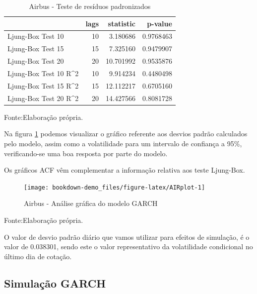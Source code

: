 \documentclass[
  12pt,
  a4paper,
  openany]{book}
\theoremstyle{definition}
\theoremstyle{definition}
\theoremstyle{definition}
\theoremstyle{remark}
\begin{document}
\begin{table}[!h]

\caption{\label{tab:AIRLjunk}Airbus - Teste de resíduos padronizados}
\centering
\begin{tabular}[t]{lrrr}
\toprule
  & lags & statistic & p-value\\
\midrule
Ljung-Box Test 10 & 10 & 3.180686 & 0.9768463\\
Ljung-Box Test 15 & 15 & 7.325160 & 0.9479907\\
Ljung-Box Test 20 & 20 & 10.701992 & 0.9535876\\
Ljung-Box Test 10 R\textasciicircum{}2 & 10 & 9.914234 & 0.4480498\\
Ljung-Box Test 15 R\textasciicircum{}2 & 15 & 12.112217 & 0.6705160\\
\addlinespace
Ljung-Box Test 20 R\textasciicircum{}2 & 20 & 14.427566 & 0.8081728\\
\bottomrule
\end{tabular}
\end{table}
\FloatBarrier
\centering

Fonte:Elaboração própria.

\justifying
\bigskip

Na figura \ref{fig:AIRplot} podemos visualizar o gráfico referente aos desvios padrão calculados pelo modelo, assim como a volatilidade para um intervalo de confiança a 95\%, verificando-se uma boa resposta por parte do modelo.

Os gráficos ACF vêm complementar a informação relativa aos teste Ljung-Box.

\begin{figure}

{\centering \texttt{[image: bookdown-demo\_files/figure-latex/AIRplot-1]} 

}

\caption{Airbus - Análise gráfica do modelo GARCH}\label{fig:AIRplot}
\end{figure}
\FloatBarrier
\centering

Fonte:Elaboração própria.

\justifying
\bigskip

O valor de desvio padrão diário que vamos utilizar para efeitos de simulação, é o valor de 0.038301, sendo este o valor representativo da volatilidade condicional no último dia de cotação.

\hypertarget{simulauxe7uxe3o-garch}{%
\subsection{Simulação GARCH}\label{simulauxe7uxe3o-garch}}
\end{document}
